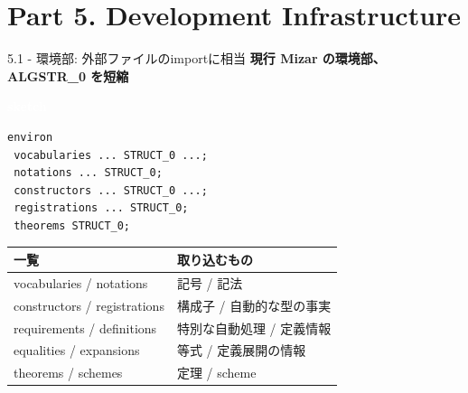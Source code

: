 \documentclass[dvipdfmx,aspectratio=169,11pt]{beamer}
\newcommand{\statusbadge}[2]{\colorbox{#1}{\textcolor{white}{\strut\scriptsize\sffamily\bfseries #2}}}
\newcommand{\badgeSketch}{\statusbadge{orange!75!black}{sketch}}
\begin{document}
\section{Part 5. Development Infrastructure}
\begin{frame}[fragile,t]{5.1 - 環境部: 外部ファイルのimportに相当}
\smallskip
\textbf{現行 Mizar の環境部、ALGSTR\_0 を短縮}~\badgeSketch
\begin{lstlisting}[language={mizar},basicstyle=\ttfamily\small]
environ
 vocabularies ... STRUCT_0 ...;
 notations ... STRUCT_0;
 constructors ... STRUCT_0 ...;
 registrations ... STRUCT_0;
 theorems STRUCT_0;
\end{lstlisting}
\par{}
\begin{footnotesize}
\setlength{\tabcolsep}{3pt}
\renewcommand{\arraystretch}{1.15}
\renewcommand{\arraystretch}{0.93}
\begin{tabularx}{\textwidth}{l>{\raggedright\arraybackslash}X}
\toprule
\textbf{一覧} & \textbf{取り込むもの} \\
\midrule
vocabularies / notations & 記号 / 記法 \\
constructors / registrations & 構成子 / 自動的な型の事実 \\
requirements / definitions & 特別な自動処理 / 定義情報 \\
equalities / expansions & 等式 / 定義展開の情報 \\
theorems / schemes & 定理 / scheme \\
\bottomrule
\end{tabularx}
\end{footnotesize}


\end{frame}
\end{document}
